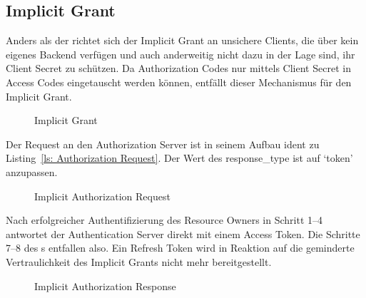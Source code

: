 \subsection{Implicit Grant}\label{ssec:implicit}
Anders als der  richtet sich der Implicit Grant an
unsichere Clients, die über kein eigenes Backend verfügen und auch anderweitig
nicht dazu in der Lage sind, ihr Client Secret zu schützen. Da Authorization
Codes nur mittels Client Secret in Access Codes eingetauscht werden können,
entfällt dieser Mechanismus für den Implicit Grant.

\begin{figure}[h]
    \scalebox{.6} {
        
    }
    \caption{Implicit Grant}\label{fig: Implicit Grant}
\end{figure} \noindent
Der Request an den Authorization Server ist in seinem Aufbau ident zu Listing~\ref{ls: Authorization Request}. Der Wert des response\_type ist auf `token'
anzupassen.

\begin{figure}[h]
    \scalebox{.8}{
        
    }
    \caption{Implicit Authorization Request}\label{ls: Implicit Authorization Request}
\end{figure} \noindent
Nach erfolgreicher Authentifizierung des Resource Owners in Schritt 1--4
antwortet der Authentication Server direkt mit einem Access Token. Die Schritte
7--8 des s entfallen also. Ein Refresh
Token wird in Reaktion auf die geminderte Vertraulichkeit des Implicit Grants
nicht mehr bereitgestellt.

\begin{figure}[h]
    \scalebox{.8}{
        
    }
    \caption{Implicit Authorization Response}\label{ls: Implicit Authorization Response}
\end{figure}
